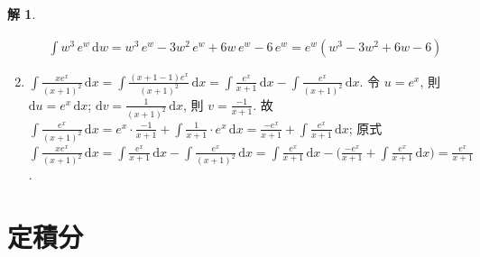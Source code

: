 \documentclass[12pt,a4paper]{extarticle}
\newcommand{\ds}{\displaystyle}
\newcommand{\ie}{\;\Longrightarrow\;}
\theoremstyle{definition}
\newtheorem*{sol}{解}
\begin{document}
\begin{sol}
\begin{enumerate}
\begin{minipage}{0.8\textwidth}
    \begin{align*}
      \int w^3\,e^w\,\mathrm{d}w = w^3\,e^w - 3w^2\,e^w + 6w\,e^w - 6\,e^w = e^w(w^3 - 3w^2 + 6w - 6)
    \end{align*}
  \end{minipage}
    \item $\ds\int\!\frac{x e^x}{(x + 1)^2}\,\text{d}x = \int\!\frac{(x + 1 - 1)e^x}{(x + 1)^2}\,\text{d}x = \int\!\frac{e^x}{x + 1}\,\text{d}x - \int\!\frac{e^x}{(x + 1)^2}\,\text{d}x$. 令 $\ds u = e^x$, 則 $\ds\text{d}u = e^x\,\text{d}x$; $\ds\text{d}v = \frac{1}{(x + 1)^2}\,\text{d}x$, 則 $\ds v = \frac{-1}{x + 1}$. 故 $\ds\int\!\frac{e^x}{(x + 1)^2}\,\mathrm{d}x = e^x\cdot\frac{-1}{x + 1} + \int\!\frac{1}{x + 1}\cdot e^x\,\text{d}x = \frac{-e^x}{x + 1} + \int\!\frac{e^x}{x + 1}\,\text{d}x$; 原式 $\ds\int\!\frac{x e^x}{(x + 1)^2}\,\text{d}x = \int\!\frac{e^x}{x + 1}\,\text{d}x - \int\!\frac{e^x}{(x + 1)^2}\,\text{d}x = \int\!\frac{e^x}{x + 1}\,\text{d}x - \Big(\frac{-e^x}{x + 1} + \int\!\frac{e^x}{x + 1}\,\text{d}x\Big) = \frac{e^x}{x + 1}$. 
  \end{enumerate}
\end{sol}

\section*{定積分}
\end{document}
